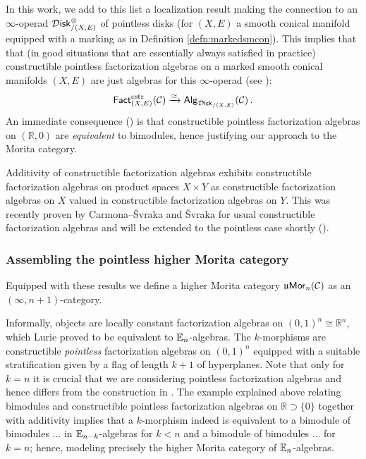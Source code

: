 \documentclass[10pt, reqno, twoside
, final
]{amsart}
\numberwithin{equation}{subsection}%
\theoremstyle{definition}
\theoremstyle{definition}
\theoremstyle{definition}
\theoremstyle{definition}
\theoremstyle{definition}
\theoremstyle{definition}
\theoremstyle{definition}
\theoremstyle{definition}
\theoremstyle{definition}
\theoremstyle{plain}
\theoremstyle{definition}
\theoremstyle{plain}
\theoremstyle{definition}
\theoremstyle{plain}
\theoremstyle{definition}
\theoremstyle{definition}
\theoremstyle{plain}
\theoremstyle{plain}
\theoremstyle{definition}
\theoremstyle{plain}
\theoremstyle{plain}
\theoremstyle{plain}
\begin{document}
In this work, we add to this list a localization result making the connection to an $\infty$-operad $\mathcal{D}\mathsf{isk}_{/(X,E)}^{\otimes}$ of pointless disks (for $(X,E)$ a smooth conical manifold equipped with a marking as in Definition \ref{defn:markedsmcon}).
This implies that that (in good situations that are essentially always satisfied in practice) constructible pointless factorization algebras on a marked smooth conical manifolds $(X,E)$ are just algebras for this $\infty$-operad (see ):
\begin{equation*}
    \mathsf{Fact}^{\mathrm{cstr}}_{(X,E)}(\mathcal{C}) \xrightarrow{\simeq}  \mathsf{Alg}_{\mathcal{D}\mathsf{isk}_{/(X,E)}}(\mathcal{C}) \,.  
\end{equation*} 
An immediate consequence () is that constructible pointless factorization algebras on $(\mathbb{R}, 0)$ are {\em equivalent} to bimodules, hence justifying our approach to the Morita category.

Additivity of constructible factorization algebras exhibits constructible factorization algebras on product spaces $X\times Y$ as constructible factorization algebras on $X$ valued in constructible factorization algebras on $Y$. This was recently proven by Carmona--\v{S}vraka \cite{Carmona-Svraka} and \v{S}vraka \cite{Svraka} for usual constructible factorization algebras and will be extended to the pointless case shortly (\cite{ScStSv}).



\subsubsection{Assembling the pointless higher Morita category}
Equipped with these results we define a higher Morita category $\mathfrak{u}\mathsf{Mor}_n(\mathcal{C})$ as an $(\infty,n+1)$-category.

Informally, objects are locally constant factorization algebras on $(0,1)^n \cong \mathbb{R}^n$, which Lurie proved to be equivalent to $\mathbb{E}_n$-algebras.
The $k$-morphisms are constructible {\em pointless} factorization algebras on $(0,1)^n$ equipped with a suitable stratification given by a flag of length $k+1$ of hyperplanes.
Note that only for $k=n$ it is crucial that we are considering pointless factorization algebras and hence differs from the construction in \cite{Scheimbauer}.
The example explained above relating bimodules and constructible pointless factorization algebras on $\mathbb{R} \supset \{0\}$ together with additivity implies that a $k$-morphism indeed is equivalent to a bimodule of bimodules ... in $\mathbb{E}_{n-k}$-algebras for $k<n$ and a bimodule of bimodules ... for $k=n$; hence, modeling precisely the higher Morita category of $\mathbb{E}_n$-algebras.
\end{document}
